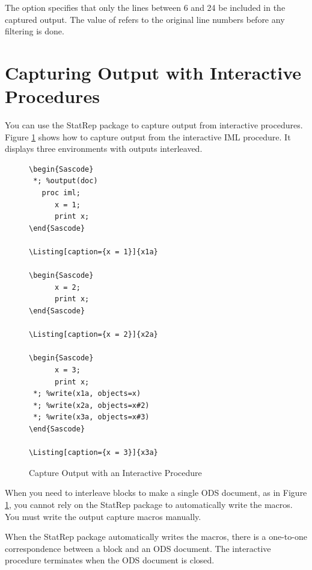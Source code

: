 \documentclass[article,oneside]{memoir}
\newcommand*{\StatRep}{\textsf{StatRep}\xspace}
\begin{document}
  The  option specifies that only the lines between 6 and 24
  be included in the captured output.
  The value of  refers to the original line numbers before any filtering is done.


\section{Capturing Output with Interactive Procedures}
  You can use the \StatRep package to capture output from interactive procedures.
Figure \ref{interact} shows how to capture output from the interactive
  IML procedure.  It displays three  environments with 
  outputs interleaved.

\begin{figure}[H]
\begin{snugshade}
\begin{verbatim}
\begin{Sascode}
 *; %output(doc)
   proc iml;
      x = 1;
      print x;
\end{Sascode}

\Listing[caption={x = 1}]{x1a}

\begin{Sascode}
      x = 2;
      print x;
\end{Sascode}

\Listing[caption={x = 2}]{x2a}

\begin{Sascode}
      x = 3;
      print x;
 *; %write(x1a, objects=x)
 *; %write(x2a, objects=x#2)
 *; %write(x3a, objects=x#3)
\end{Sascode}

\Listing[caption={x = 3}]{x3a}
\end{verbatim}
\end{snugshade}
\caption{Capture Output with an Interactive Procedure}\label{interact}
\end{figure}

  When you need to interleave  blocks to make a single ODS
  document, as in Figure \ref{interact}, you cannot rely on the \StatRep package to
  automatically write the macros. You must write the output capture macros manually.

  When the \StatRep package automatically writes the macros, there is a
  one-to-one correspondence between a  block and an ODS document.
  The interactive procedure terminates when the ODS document is closed.
\end{document}
